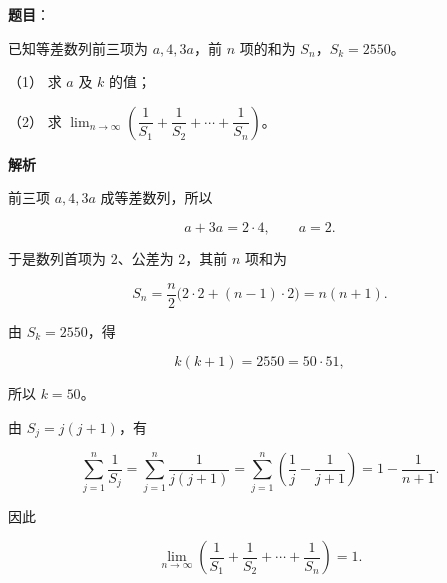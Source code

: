 \begin{answer}

\textbf{题目}：

已知等差数列前三项为 $a,4,3a$，前 $n$ 项的和为 $S_n$，$S_k=2550$。

（1） 求 $a$ 及 $k$ 的值；

（2） 求 $\displaystyle\lim_{n\to\infty}\left(\dfrac1{S_1}+\dfrac1{S_2}+\cdots+\dfrac1{S_n}\right)$。

\textbf{解析}


前三项 $a,4,3a$ 成等差数列，所以

\nopagebreak[4]
\[
a+3a=2\cdot4,\qquad a=2.
\]

于是数列首项为 $2$、公差为 $2$，其前 $n$ 项和为

\nopagebreak[4]
\[
S_n=\frac{n}{2}\bigl(2\cdot2+(n-1)\cdot2\bigr)=n(n+1).
\]

由 $S_k=2550$，得

\nopagebreak[4]
\[
k(k+1)=2550=50\cdot51,
\]

所以 $k=50$。


由 $S_j=j(j+1)$，有

\nopagebreak[4]
\[
\sum_{j=1}^{n}\frac1{S_j}
=\sum_{j=1}^{n}\frac1{j(j+1)}
=\sum_{j=1}^{n}\left(\frac1j-\frac1{j+1}\right)
=1-\frac1{n+1}.
\]

因此

\nopagebreak[4]
\[
\lim_{n\to\infty}\left(\frac1{S_1}+\frac1{S_2}+\cdots+\frac1{S_n}\right)=1.
\]



\end{answer}
